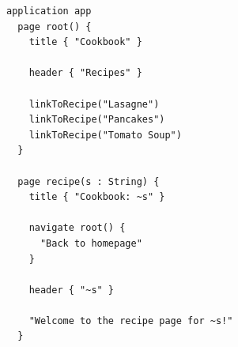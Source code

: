       \begin{figure}
        \begin{subfigure}[t]{0.45\textwidth}
          \begin{verbatim}
application app
  page root() {
    title { "Cookbook" }

    header { "Recipes" }

    linkToRecipe("Lasagne")
    linkToRecipe("Pancakes")
    linkToRecipe("Tomato Soup")
  }

  page recipe(s : String) {
    title { "Cookbook: ~s" }

    navigate root() {
      "Back to homepage"
    }

    header { "~s" }

    "Welcome to the recipe page for ~s!"
  }


\end{verbatim}
\end{subfigure}
\end{figure}
